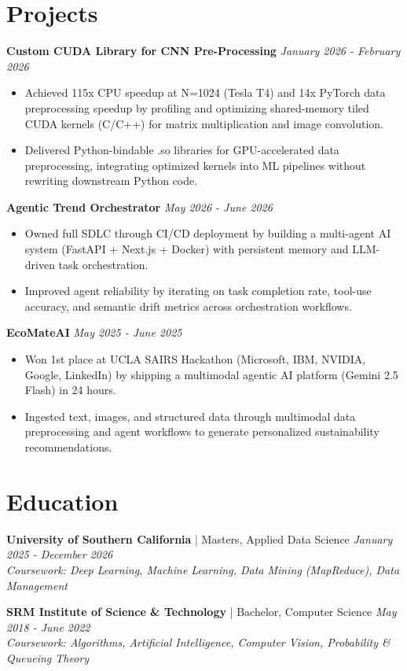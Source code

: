 \documentclass[9pt,letterpaper]{article}
\newcommand{\projsep}{\vspace{2pt}}%
\newcommand{\projtitle}[2]{%
  \noindent
  {\small\textbf{#1}}%
  \hfill
  {\small\color{headgray}\textit{#2}}\\[-7pt]
}
\newcommand{\edutitle}[3]{%
  \noindent
  {\small\textbf{#1}} {\small\color{headgray}| #2}%
  \hfill
  {\small\color{headgray}\textit{#3}}\\[1pt]
}
\newcommand{\educourse}[1]{%
  {\small\color{headgray}\textit{Coursework: #1}}\par\vspace{5pt}%
}
\begin{document}
\section{Projects}
\projtitle{Custom CUDA Library for CNN Pre-Processing}{January 2026 - February 2026}
\begin{itemize}
  \item Achieved 115x CPU speedup at N=1024 (Tesla T4) and 14x PyTorch data preprocessing speedup by profiling and optimizing shared-memory tiled CUDA kernels (C/C++) for matrix multiplication and image convolution.
  \item Delivered Python-bindable .so libraries for GPU-accelerated data preprocessing, integrating optimized kernels into ML pipelines without rewriting downstream Python code.
\end{itemize}
\projsep
\projtitle{Agentic Trend Orchestrator}{May 2026 - June 2026}
\begin{itemize}
  \item Owned full SDLC through CI/CD deployment by building a multi-agent AI system (FastAPI + Next.js + Docker) with persistent memory and LLM-driven task orchestration.
  \item Improved agent reliability by iterating on task completion rate, tool-use accuracy, and semantic drift metrics across orchestration workflows.
\end{itemize}
\projsep
\projtitle{EcoMateAI}{May 2025 - June 2025}
\begin{itemize}
  \item Won 1st place at UCLA SAIRS Hackathon (Microsoft, IBM, NVIDIA, Google, LinkedIn) by shipping a multimodal agentic AI platform (Gemini 2.5 Flash) in 24 hours.
  \item Ingested text, images, and structured data through multimodal data preprocessing and agent workflows to generate personalized sustainability recommendations.
\end{itemize}
\section{Education}
\edutitle{University of Southern California}{Masters, Applied Data Science}{January 2025 - December 2026}
\educourse{Deep Learning, Machine Learning, Data Mining (MapReduce), Data Management}
\vspace{2pt}
\edutitle{SRM Institute of Science \& Technology}{Bachelor, Computer Science}{May 2018 - June 2022}
\educourse{Algorithms, Artificial Intelligence, Computer Vision, Probability \& Queueing Theory}
\end{document}
